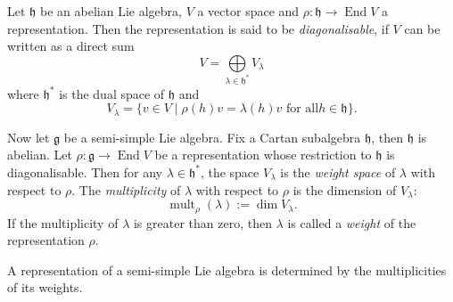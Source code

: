 \documentclass[12pt]{article}
\newcommand{\DirectSum}{\bigoplus\limits}
\newcommand{\mf}{\mathfrak}
\DeclareMathOperator{\End}{End}
\DeclareMathOperator{\mult}{mult}
\begin{document}
Let $\mf{h}$ be an abelian Lie algebra, $V$ a vector space and
$\rho\colon\mf{h}\to\End V$ a representation. Then the representation
is said to be \emph{diagonalisable}, if $V$ can be written as a direct
sum
\begin{equation*}
V=\DirectSum_{\lambda\in\mf{h}^*}V_\lambda
\end{equation*}
where $\mf{h}^*$ is the dual space of $\mf{h}$ and
\begin{equation*}
V_\lambda=\{v\in V\mid\rho(h)v=\lambda(h)v\text{ for all
}h\in\mf{h}\}.
\end{equation*}

Now let $\mf{g}$ be a semi-simple Lie algebra. Fix a Cartan subalgebra
$\mf{h}$, then $\mf{h}$ is abelian. Let $\rho\colon\mf{g}\to\End
V$ be a representation whose restriction to $\mf{h}$ is
diagonalisable. Then for any $\lambda\in\mf{h}^*$, the space
$V_\lambda$ is the \emph{weight space} of $\lambda$ with respect to
$\rho$. The \emph{multiplicity} of
$\lambda$ with respect to $\rho$ is the dimension of $V_\lambda$:
\begin{equation*}
\mult_\rho(\lambda):=\dim V_\lambda.
\end{equation*}
If the multiplicity of $\lambda$ is greater than zero, then $\lambda$
is called a \emph{weight} of the representation $\rho$.

A representation of a semi-simple Lie algebra is determined by the
multiplicities of its weights.
\end{document}
